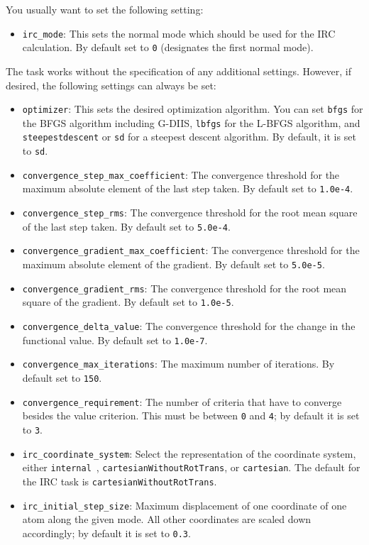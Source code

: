 \documentclass[]{tufte-book}
\begin{document}
You usually want to set the following setting:
\begin{itemize}
\item \texttt{irc\_mode}: This sets the normal mode which should be used for the IRC calculation. By default set to \texttt{0}
(designates the first normal mode).
\end{itemize}

The task works without the specification of any additional settings.
However, if desired, the following settings can always be set:
\begin{itemize}
\item \texttt{optimizer}: This sets the desired optimization algorithm. You can set \texttt{bfgs} for the BFGS algorithm including
G-DIIS, \texttt{lbfgs} for the L-BFGS algorithm, and
\texttt{steepestdescent} or \texttt{sd} for a steepest descent algorithm. By default, it is set to \texttt{sd}.
\item \texttt{convergence\_step\_max\_coefficient}: The convergence threshold for the maximum absolute element of the last step taken.
By default set to \texttt{1.0e-4}.
\item \texttt{convergence\_step\_rms}: The convergence threshold for the root mean square of the last step taken. By default set to
\texttt{5.0e-4}.
\item \texttt{convergence\_gradient\_max\_coefficient}: The convergence threshold for the maximum absolute element of the gradient.
By default set to \texttt{5.0e-5}.
\item \texttt{convergence\_gradient\_rms}: The convergence threshold for the root mean square of the gradient. By default set to
\texttt{1.0e-5}.
\item \texttt{convergence\_delta\_value}: The convergence threshold for the change in the functional value. By default set to
\texttt{1.0e-7}.
\item \texttt{convergence\_max\_iterations}: The maximum number of iterations. By default set to \texttt{150}.
\item \texttt{convergence\_requirement}: The number of criteria that have to converge besides the value criterion. This
must be between \texttt{0} and \texttt{4}; by default it is set to \texttt{3}.
\item \texttt{irc\_coordinate\_system}: Select the representation of the coordinate system, either \texttt{internal}~\cite{libirc}, \texttt{cartesianWithoutRotTrans}, or \texttt{cartesian}.
The default for the IRC task is \texttt{cartesianWithoutRotTrans}.
\item \texttt{irc\_initial\_step\_size}: Maximum displacement of one coordinate of one atom along the given mode. All other coordinates are scaled down accordingly; by default it is set to \texttt{0.3}.

\end{itemize}
\end{document}
